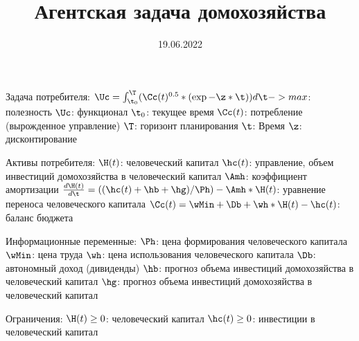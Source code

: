 \documentclass[12pt]{article}
\title{Агентская задача домохозяйства}
\date{19.06.2022}
\begin{document}
Задача потребителя:
    $\Uc = \int_{\t_{0}}^\T (\Cc(t)^{0.5}*(\exp{-\z*\t}))d\t -> max$: полезность
    $\Uc$: функционал
    $\t_{0}$: текущее время
    $\Cc(t)$: потребление (вырожденное управление)
    $\T$: горизонт планирования
    $\t$: Время
    $\z$: дисконтирование

Активы потребителя:
    $\H(t)$: человеческий капитал
    $\hc(t)$: управление, объем инвестиций домохозяйства в человеческий капитал
    $\Amh$: коэффициент амортизации
    $\frac{d\H(t)}{d\t} = ((\hc(t)+\hb+\hg)/\Ph)-\Amh*\H(t)$: уравнение переноса человеческого капитала
    $\Cc(t) = \wMin+\Db+\wh*\H(t)-\hc(t)$: баланс бюджета


Информационные переменные:
    $\Ph$: цена формирования человеческого капитала
    $\wMin$: цена труда
    $\wh$: цена использования человеческого капитала
    $\Db$: автономный доход (дивиденды)
    $\hb$: прогноз объема инвестиций домохозяйства в человеческий капитал
    $\hg$: прогноз объема инвестиций домохозяйства в человеческий капитал

Ограничения:
    $\H(t)\geq 0$: человеческий капитал
    $\hc(t)\geq 0$: инвестиции в человеческий капитал
\end{document}
